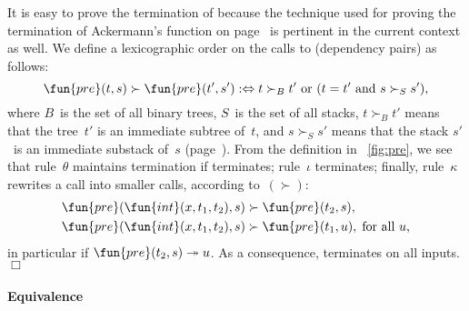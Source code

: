 It is easy to prove the termination of
 because the technique used for
proving the termination of Ackermann's function on
page~\pageref{par:ackermann} is pertinent in the current context as
well. We define a lexicographic order on the calls to 
(dependency pairs) as follows:
\begin{equation}
\fun{pre}(t,s) \succ \fun{pre}(t',s') :\Leftrightarrow \text{\(t
  \succ_{B} t'\) or (\(t = t'\) and \(s \succ_{S} s'\))},
\label{eq:BS_order}
\end{equation}
where \(B\)~is the set of all binary trees, \(S\)~is the set of all
stacks, \(t \succ_{B} t'\) means that the tree~\(t'\) is an immediate
subtree of~\(t\), and \(s
\succ_{S} s'\) means that the stack \(s'\)~is an immediate
substack of~\(s\)
(page~\pageref{par:well-founded}).  From the definition in
\fig~\vref{fig:pre}, we see that rule~\(\theta\) maintains termination
if  terminates; rule~\(\iota\)
terminates; finally, rule~\(\kappa\) rewrites a call into smaller
calls, according to~\((\succ)\):
\begin{align*}
  \fun{pre}(\fun{int}(x,t_1,t_2),s) &\succ \fun{pre}(t_2,s),\\
  \fun{pre}(\fun{int}(x,t_1,t_2),s) &\succ \fun{pre}(t_1,u),\; \text{for
    all~\(u\),}
\end{align*}
in particular if \(\fun{pre}(t_2,s) \twoheadrightarrow u\). As a
consequence,  terminates on all
inputs.\hfill\(\Box\)

\paragraph{Equivalence}

